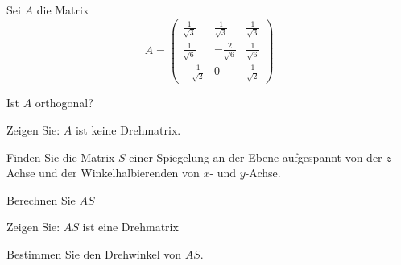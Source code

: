 Sei $A$ die Matrix
\[
A=\begin{pmatrix}
\frac1{\sqrt{3}}&\frac1{\sqrt{3}}&\frac1{\sqrt{3}}\\
\frac1{\sqrt{6}}&-\frac2{\sqrt{6}}&\frac1{\sqrt{6}}\\
-\frac1{\sqrt{2}}&0&\frac1{\sqrt{2}}
\end{pmatrix}
\]
\begin{teilaufgaben}
\item Ist $A$ orthogonal?
\item Zeigen Sie: $A$ ist keine Drehmatrix.
\item Finden Sie die Matrix $S$ einer Spiegelung an der
Ebene aufgespannt von der $z$-Achse und der Winkelhalbierenden
von $x$- und $y$-Achse.
\item Berechnen Sie $AS$
\item Zeigen Sie: $AS$ ist eine Drehmatrix
\item Bestimmen Sie den Drehwinkel von $AS$.
\end{teilaufgaben}

